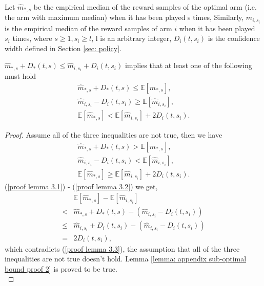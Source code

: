\begin{lemma}
\label{lemma: appendix sub-optimal bound proof 2}

Let $\hat{m}_{*, s}$ be the empirical median of the reward samples of the optimal arm (i.e. the arm with maximum median) when it has been played s times, Similarly, $\hat{m}_{i, s_i}$ is the empirical median of the reward samples of arm $i$ when it has been played $s_i$ times, where $s \geq 1, s_i \geq l$, l is an arbitrary integer,  $D_i(t, s_i)$ is the confidence width defined in Section \ref{sec: policy}.

    $\hat{m}_{*, s} +   D_*(t, s)  \leq \hat{m}_{i, s_i} +   D_i(t, s_i)$ implies that at least one of the following must hold
    \begin{align}
        \label{lemma 3.1}
        \hat{m}_{*, s} +   D_*(t, s) \leq  \mathbb{E}[\hat{m}_{*, s}],\\
        \label{lemma 3.2}
        \hat{m}_{i, s_i} -   D_i(t, s_i) \geq \mathbb{E}[\hat{m}_{i, s_i}],\\
        \label{lemma 3.3}
        \mathbb{E}[\hat{m}_{*, s}] < \mathbb{E}[\hat{m}_{i, s_i}] + 2   D_i(t, s_i).
    \end{align}
\end{lemma}

\begin{proof}
Assume all of the three inequalities are not true, then we have
    \begin{align}
        \label{proof lemma 3.1}
         \hat{m}_{*, s} +   D_*(t, s) >  \mathbb{E}[\hat{m}_{*, s}],\\
        \label{proof lemma 3.2}
        \hat{m}_{i, s_i} -   D_i(t, s_i) < \mathbb{E}[\hat{m}_{i, s_i}],\\
        \label{proof lemma 3.3}
        \mathbb{E}[\hat{m}_{*, s}] \geq \mathbb{E}[\hat{m}_{i, s_i}] + 2   D_i(t, s_i).
    \end{align}
    (\ref{proof lemma 3.1}) - (\ref{proof lemma 3.2}) we get,
    \begin{align}
         & \mathbb{E}[\hat{m}_{*, s}] - \mathbb{E}[\hat{m}_{i, s_i}] \nonumber\\
         < & \hat{m}_{*, s} +   D_*(t, s) - \left(\hat{m}_{i, s_i} -   D_i(t, s_i)\right) \\
        \leq & \hat{m}_{i, s_i} +   D_i(t, s_i) - \left(\hat{m}_{i, s_i} -   D_i(t, s_i)\right) \\
        = & 2   D_i(t, s_i),
    \end{align}
    which contradicts (\ref{proof lemma 3.3}), the assumption that all of the three inequalities are not true doesn't hold. Lemma \ref{lemma: appendix sub-optimal bound proof 2} is proved to be true.\\
\end{proof}


